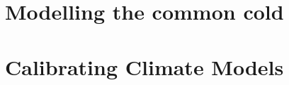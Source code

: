 \documentclass[11pt, a4paper, english]{NTNUoving}
\begin{document}
\section*{Modelling the common cold}



\section*{Calibrating Climate Models}
\end{document}
